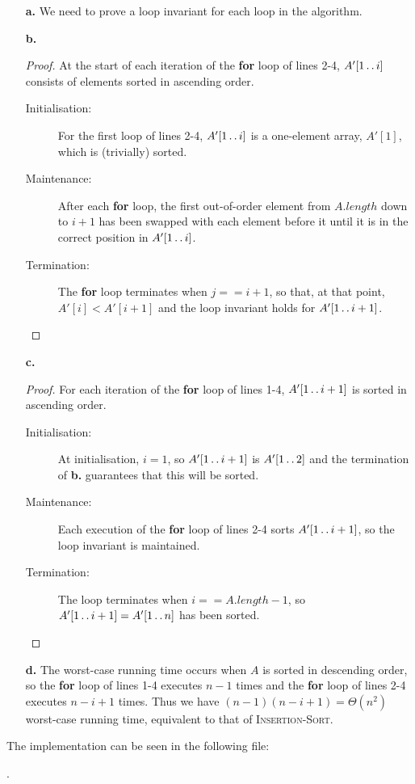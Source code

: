 
\begin{itemize}
    \item[\textbf{a.}] We need to prove a loop invariant for each loop in the algorithm.
    \item[\textbf{b.}]
        \begin{proof}
            At the start of each iteration of the \textbf{for} loop of lines 2-4, 
            $A'[1\mathinner{{\ldotp}\,{\ldotp}} i]$ consists of elements sorted in ascending order.
            \begin{description}
                \item[Initialisation:] For the first loop of lines 2-4, $A'[1 \mathinner{{\ldotp}\,{\ldotp}} i]$
                    is a one-element array, $A'[1]$, which is (trivially) sorted.
                \item[Maintenance:] After each \textbf{for} loop, the first out-of-order
                    element from $A.\mathit{length}$ down to $i + 1$ has been swapped with
                    each element before it until it is in the correct position in 
                    $A'[1 \mathinner{{\ldotp}\,{\ldotp}} i]$.
                \item[Termination:] The \textbf{for} loop terminates when $j == i + 1$,          
                    so that, at that point, $A'[i] < A'[i + 1]$ and the loop invariant 
                    holds for $A'[1 \mathinner{{\ldotp}\,{\ldotp}} i + 1]$.
            \end{description}
        \end{proof}
    \item[\textbf{c.}]
        \begin{proof}
            For each iteration of the \textbf{for} loop of lines 1-4, $A'[1 \mathinner{{\ldotp}\,{\ldotp}} i + 1]$
            is sorted in ascending order.
            \begin{description}
                \item[Initialisation:] At initialisation, $i = 1$, so $A'[1 \mathinner{{\ldotp}\,{\ldotp}} i + 1]$
                    is $A'[1 \mathinner{{\ldotp}\,{\ldotp}} 2]$ and the termination of \textbf{b.} guarantees
                    that this will be sorted.
                \item[Maintenance:] Each execution of the \textbf{for} loop of lines 2-4
                    sorts $A'[1 \mathinner{{\ldotp}\,{\ldotp}} i + 1]$, so the loop invariant is maintained.
                \item[Termination:] The loop terminates when $i == A.\mathit{length} - 1$,
                    so $A'[1 \mathinner{{\ldotp}\,{\ldotp}} i + 1] = A'[1 \mathinner{{\ldotp}\,{\ldotp}} n]$ has been sorted.
            \end{description}
        \end{proof}
    \item[\textbf{d.}] The worst-case running time occurs when $A$ is sorted in descending
        order, so the \textbf{for} loop of lines 1-4 executes $n - 1$ times and the \textbf{for}
        loop of lines 2-4 executes $n - i + 1$ times. Thus we have 
        $(n - 1)(n - i + 1) = \Theta(n^2)$ worst-case running time, equivalent to that of 
        \textsc{Insertion-Sort}.
\end{itemize}

The implementation can be seen in the following file:

.
